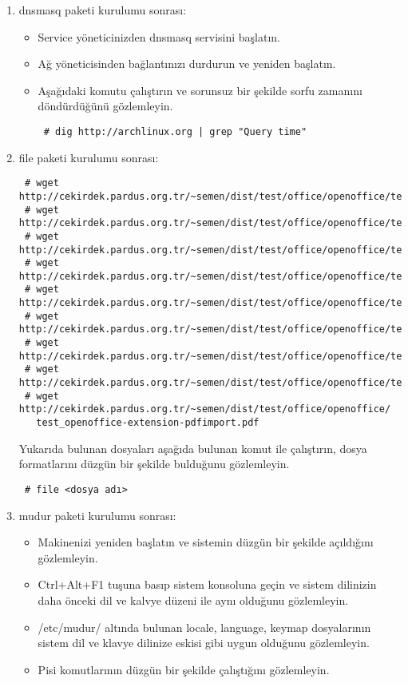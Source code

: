 \documentclass[a4paper,10pt]{article}
\begin{document}
\begin{enumerate}
\item dnsmasq paketi kurulumu sonrası:

\begin{itemize}
 \item Service yöneticinizden dnsmasq servisini başlatın.
 \item Ağ yöneticisinden bağlantınızı durdurun ve yeniden başlatın.
 \item Aşağıdaki komutu çalıştırın ve sorunsuz bir şekilde sorfu zamanını döndürdüğünü gözlemleyin.
\begin{verbatim}
 # dig http://archlinux.org | grep "Query time"
\end{verbatim}

\end{itemize}


\item file paketi kurulumu sonrası:

\begin{verbatim}
 # wget http://cekirdek.pardus.org.tr/~semen/dist/test/office/openoffice/test_oodraw.mng
 # wget http://cekirdek.pardus.org.tr/~semen/dist/test/office/openoffice/test_oodraw.odg
 # wget http://cekirdek.pardus.org.tr/~semen/dist/test/office/openoffice/test_oodraw.jpg
 # wget http://cekirdek.pardus.org.tr/~semen/dist/test/office/openoffice/test_oodraw.gif
 # wget http://cekirdek.pardus.org.tr/~semen/dist/test/office/openoffice/test_oodraw.png
 # wget http://cekirdek.pardus.org.tr/~semen/dist/test/office/openoffice/test_oodraw.tif
 # wget http://cekirdek.pardus.org.tr/~semen/dist/test/office/openoffice/test_oowriter.txt
 # wget http://cekirdek.pardus.org.tr/~semen/dist/test/office/openoffice/test_oodraw.ps
 # wget http://cekirdek.pardus.org.tr/~semen/dist/test/office/openoffice/
   test_openoffice-extension-pdfimport.pdf
\end{verbatim}

Yukarıda bulunan dosyaları aşağıda bulunan komut ile çalıştırın, dosya formatlarını düzgün bir şekilde bulduğunu gözlemleyin.
\begin{verbatim}
 # file <dosya adı>
\end{verbatim}

\item mudur paketi kurulumu sonrası:

\begin{itemize}
  \item Makinenizi yeniden başlatın ve sistemin düzgün bir şekilde açıldığını  gözlemleyin.
 \item Ctrl+Alt+F1 tuşuna basıp sistem konsoluna geçin ve sistem dilinizin daha önceki dil ve kalvye düzeni ile aynı olduğunu gözlemleyin.
  \item /etc/mudur/ altında bulunan locale, language, keymap dosyalarının sistem dil ve klavye dilinize eskisi gibi uygun olduğunu gözlemleyin.
 \item Pisi komutlarının düzgün bir şekilde çalıştığını gözlemleyin. 


\end{itemize}
\end{enumerate}
\end{document}

